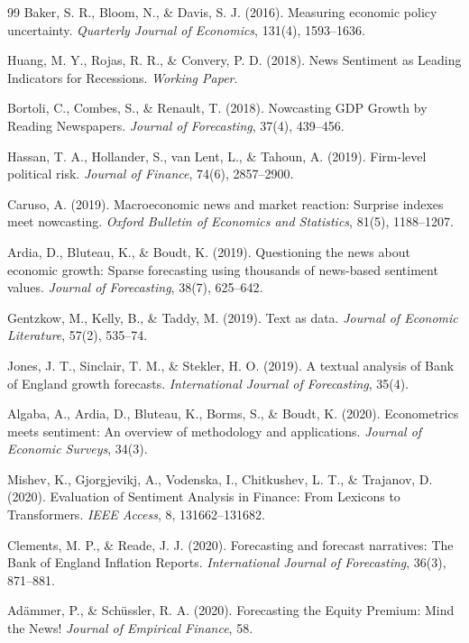 \documentclass[11pt]{article}
\begin{document}
\begin{thebibliography}{99}
 Baker, S. R., Bloom, N., \& Davis, S. J. (2016). Measuring economic policy uncertainty. \textit{Quarterly Journal of Economics}, 131(4), 1593--1636.

 Huang, M. Y., Rojas, R. R., \& Convery, P. D. (2018). News Sentiment as Leading Indicators for Recessions. \textit{Working Paper}.

 Bortoli, C., Combes, S., \& Renault, T. (2018). Nowcasting GDP Growth by Reading Newspapers. \textit{Journal of Forecasting}, 37(4), 439--456.

 Hassan, T. A., Hollander, S., van Lent, L., \& Tahoun, A. (2019). Firm-level political risk. \textit{Journal of Finance}, 74(6), 2857--2900.

 Caruso, A. (2019). Macroeconomic news and market reaction: Surprise indexes meet nowcasting. \textit{Oxford Bulletin of Economics and Statistics}, 81(5), 1188--1207.

 Ardia, D., Bluteau, K., \& Boudt, K. (2019). Questioning the news about economic growth: Sparse forecasting using thousands of news-based sentiment values. \textit{Journal of Forecasting}, 38(7), 625--642.

 Gentzkow, M., Kelly, B., \& Taddy, M. (2019). Text as data. \textit{Journal of Economic Literature}, 57(2), 535--74.

 Jones, J. T., Sinclair, T. M., \& Stekler, H. O. (2019). A textual analysis of Bank of England growth forecasts. \textit{International Journal of Forecasting}, 35(4).

 Algaba, A., Ardia, D., Bluteau, K., Borms, S., \& Boudt, K. (2020). Econometrics meets sentiment: An overview of methodology and applications. \textit{Journal of Economic Surveys}, 34(3).

 Mishev, K., Gjorgjevikj, A., Vodenska, I., Chitkushev, L. T., \& Trajanov, D. (2020). Evaluation of Sentiment Analysis in Finance: From Lexicons to Transformers. \textit{IEEE Access}, 8, 131662--131682.

 Clements, M. P., \& Reade, J. J. (2020). Forecasting and forecast narratives: The Bank of England Inflation Reports. \textit{International Journal of Forecasting}, 36(3), 871--881.

 Adämmer, P., \& Schüssler, R. A. (2020). Forecasting the Equity Premium: Mind the News! \textit{Journal of Empirical Finance}, 58.


\end{thebibliography}
\end{document}
